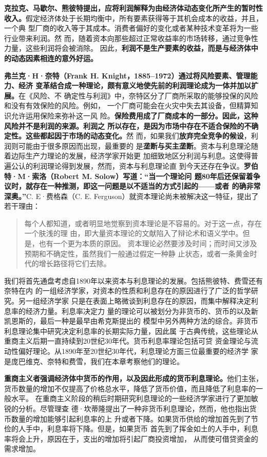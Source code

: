 \textbf{克拉克、马歇尔、熊彼特提出，应将利润解释为由经济体动态变化所产生的暂时性
  收入。}假定经济体处于长期均衡中，所有要素获得等于其机会成本的收益，并且，一个典
型厂商的收入等于其成本。消费者偏好的变化或者某种技术变革将为一些行业带来利润。然
而，随着资本向那些超过正常收益率的市场转移，通过竞争性力量，这些利润将会被消除。
因此，\textbf{利润不是生产要素的收益，而是与经济体中的动态因素相连的意外好运。}

\textbf{弗兰克·H·奈特（Frank H. Knight，1885--1972）通过将风险要素、管理能力、经济
  变革结合成一种理论，颇有意义地使先前的利润理论成为一体并加以扩展。}在《风险、不
确定性与利润》中，奈特区分了厂商所采取的能够投保的风险和没有有效保险的风险。例如，
一个厂商可能会在火灾中失去其设备，但精算知识允许运用保险来弥补这一风
险。\textbf{保险费用成了厂商成本的一部分。因此，这种风险并不是利润的来源。利润之
  所以存在，是因为市场中存在不适合保险的不确定性。这些都起因于市场的动态变化。}然
而，如果我们\textbf{放弃完全竞争的候设}，利润则可能由于很多原因而出现，最重要的
是\textbf{垄断与买主垄断}。资本与利息理沦随着边际生产力理论的发展，经济学家开始更
加细致地区分利润与利息。这使得普遍公认的利润理论得到发展，然而，资本与利息理论直
到今天还存在争议。\textbf{罗伯特·M·索洛（Robert M. Solow）写道：“当一个理论问
  题80年后还保留着争议时，就存在一种推测，即这一问题是以不适当的方式引起的——或者
  的确非常深奥。”}C. E·费格森（C. E. Ferguson）就资本理论尚未被解决这一特征，提出了
若干理由：
\begin{quotation}
  每个人都知道，或者明显地觉察到资本理论是不容易的。对于这一点，存在一个肤浅的理
  由，即大量资本理论的文献陷入了辩论术和语义学中。但是，也有一个更为本质的原因。
  资本理论必然要涉及时间；而时间又涉及预期和不确定性，虽然我们一般通过假定一种静
  止状态，或者一条黄金时代的增长路径将它们去除。
\end{quotation}

我们将首先通盘考虑自1890年以来资本与利息理论的发展。包括熊彼特、费雪还有奈特在内
的一组经济学家，对资本的性质和利息存在的原因进行了广泛的哲学研究。另一组经济学家
只是在表面上略微谈到利息存在的原因，而集中解释决定利息率的经济力量。利息率决定力
量的理论可以被划分为非货币的、货币的以及新凯恩斯的，最后一种是最早由希克斯提出的
模型中另外两种方法的综合。非货币利息理论集中研究决定利息率的长期实际力量，因此属
于古典传统，这些理论从重商主义后期一直持续到20世纪30年代。货币利息率理论包括可贷
资金理论与流动性偏好理论。从1890年至20世纪30年代，利息理论方面三位最重要的经济学
家是庞巴维克、奈特和费雪，我们在本章考察他们的理论。

\textbf{重商主义者强调经济体中货币的作用，以及因此形成的货币利息理论。}他们主张，
货币数量的增加不仅提高了价格总水平，降低了货币价值，而且降低了利息率的一般水平。
在重商主义阶段的稍后时期研究利息理论的一些经济学家进行了更加敏锐的分析。尽管理查
德·坎蒂隆提出了一种非货币利息理论，然而，他也指出货币数量的增加能够引起利息率的上
升或者下降。如果货币供给的增加首先到了节俭的人手中，利息率将下降。但是，如果货币
首先到了挥金如土的人手中，利息率将会上升，原因在于，支出的增加将引起厂商投资增加，
从而使可借贷资金的需求增加。


